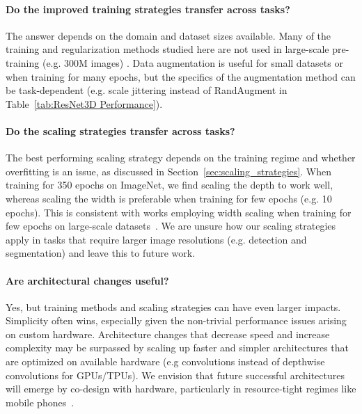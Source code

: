 \documentclass{article}
\begin{document}
\paragraph{Do the improved training strategies transfer across tasks?}
The answer depends on the domain and dataset sizes available.
Many of the training and regularization methods studied here are not used in large-scale pre-training (e.g. 300M images) \cite{kolesnikov2019big,dosovitskiy2020image}.
Data augmentation is useful for small datasets or when training for many epochs, but the specifics of the augmentation method can be task-dependent (e.g. scale jittering instead of RandAugment in Table~\ref{tab:ResNet3D Performance}).

\vspace{-0.25cm}
\paragraph{Do the scaling strategies transfer across tasks?}
The best performing scaling strategy depends on the training regime and whether overfitting is an issue, as discussed in Section~\ref{sec:scaling_strategies}.
When training for 350 epochs on ImageNet, we find scaling the depth to work well, whereas scaling the width is preferable when training for few epochs (e.g. 10 epochs).
This is consistent with works employing width scaling when training for few epochs on large-scale datasets~\cite{kolesnikov2019big}.
We are unsure how our scaling strategies apply in tasks that require larger image resolutions (e.g. detection and segmentation) and leave this to future work.

\vspace{-0.25cm}
\paragraph{Are architectural changes useful?}
Yes, but training methods and scaling strategies can have even larger impacts.
Simplicity often wins, especially given the non-trivial performance issues arising on custom hardware.
Architecture changes that decrease speed and increase complexity may be surpassed by scaling up faster and simpler architectures that are optimized on available hardware (e.g convolutions instead of depthwise convolutions for GPUs/TPUs).
We envision that future successful architectures will emerge by co-design with hardware, particularly in resource-tight regimes like mobile phones~\cite{howard2019searching}.

\vspace{-0.25cm}
\end{document}
